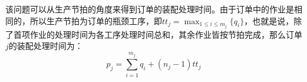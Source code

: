 

该问题可以从生产节拍的角度来得到订单的装配处理时间。由于订单中的作业是相同的，所以生产节拍为订单的瓶颈工序，即$\displaystyle tt_j = \max_{1\le i\le m_j}\{q_i\}$，也就是说，除了首项作业的处理时间为各工序处理时间总和，其余作业皆按节拍完成，那么订单$j$的装配处理时间为：
\begin{equation}
p_j = \sum_{i = 1}^{m_j}q_i + (n_j - 1)tt_j
\label{equ:processtime}
\end{equation}

